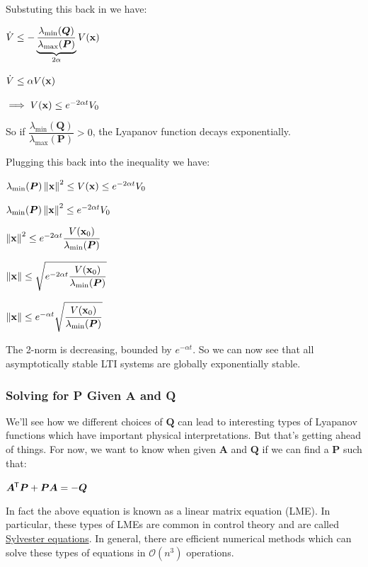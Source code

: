 \documentclass[11pt]{article}
\begin{document}
  \vspace{12pt}

  Substuting this back in we have:

  \(\dot{V} \le -\underbrace{\dfrac{\lambda_{\textrm{min}}(\bm{Q})}{\lambda_{\textrm{max}}(\bm{P})}}_{2\alpha}V(\mathbf{x})\)

  \(\dot{V} \le \alpha V(\mathbf{x})\)

  \(\implies V(\mathbf{x}) \le e^{-2\alpha t}V_0\)

  So if \(\dfrac{\lambda_{\textrm{min}}(\bm{Q})}{\lambda_{\textrm{max}}(\bm{P})} > 0\), the Lyapanov function decays
  exponentially.

  \pagebreak

  Plugging this back into the inequality we have:

  \(\lambda_{\textrm{min}}(\bm{P})\left\lVert\mathbf{x}\right\rVert^2 \le V(\mathbf{x}) \le e^{-2\alpha t}V_0\)

  \(\lambda_{\textrm{min}}(\bm{P})\left\lVert\mathbf{x}\right\rVert^2 \le e^{-2\alpha t}V_0\)

  \(\left\lVert\mathbf{x}\right\rVert^2 \le e^{-2\alpha t}\dfrac{V(\mathbf{x}_0)}{\lambda_{\textrm{min}}(\bm{P})}\)

  \(\left\lVert\mathbf{x}\right\rVert \le \sqrt{e^{-2\alpha t}\dfrac{V(\mathbf{x}_0)}{\lambda_{\textrm{min}}(\bm{P})}}\)

  \(\left\lVert\mathbf{x}\right\rVert \le e^{-\alpha t}\sqrt{\dfrac{V(\mathbf{x}_0)}{\lambda_{\textrm{min}}(\bm{P})}}\)

  The 2-norm is decreasing, bounded by \(e^{-\alpha t}\). So we can now see that all asymptotically
  stable LTI systems are globally exponentially stable.

  \subsubsection{Solving for P Given A and Q}

  We'll see how we different choices of \(\bm{Q}\) can lead to interesting types of Lyapanov functions
  which have important physical interpretations. But that's getting ahead of things. For now, we
  want to know when given \(\bm{A}\) and \(\bm{Q}\) if we can find a \(\bm{P}\) such that:

  \(\bm{A}^{\mkern-1.5mu\mathsf{T}}\bm{P} + \bm{P}\bm{A} = -\bm{Q}\)

  In fact the above equation is known as a linear matrix equation (LME). In particular, these
  types of LMEs are common in control theory and are called
  \href{https://www.wikiwand.com/en/Sylvester_equation}{Sylvester equations}. In general,
  there are efficient numerical methods which can solve these types of equations in \(\mathcal{O}(n^3)\) operations.
\end{document}
